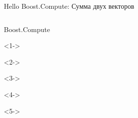 \documentclass[@BEAMER_OPTIONS@]{beamer}
\begin{document}
\begin{frame}[fragile]{Hello Boost.Compute: Сумма двух векторов}
\begin{columns}
\begin{column}{0.7\textwidth}
\begin{minipage}[c][\textheight][c]{\linewidth}
                \begin{exampleblock}{Boost.Compute}
                    \begin{adjustbox}{width=0.7\textwidth, height=\textheight, keepaspectratio}
                        \begin{minipage}{\textwidth}
                            \begin{uncoverenv}<1->
                                
                            \end{uncoverenv}
                            \begin{uncoverenv}<2->
                                
                            \end{uncoverenv}
                            \begin{uncoverenv}<3->
                                
                            \end{uncoverenv}
                            \begin{uncoverenv}<4->
                                
                            \end{uncoverenv}
                            \begin{uncoverenv}<5->
                                
                            \end{uncoverenv}
                        \end{minipage}
                    \end{adjustbox}
                \end{exampleblock}
            \end{minipage}
        \end{column}
    \end{columns}
\end{frame}
\end{document}
